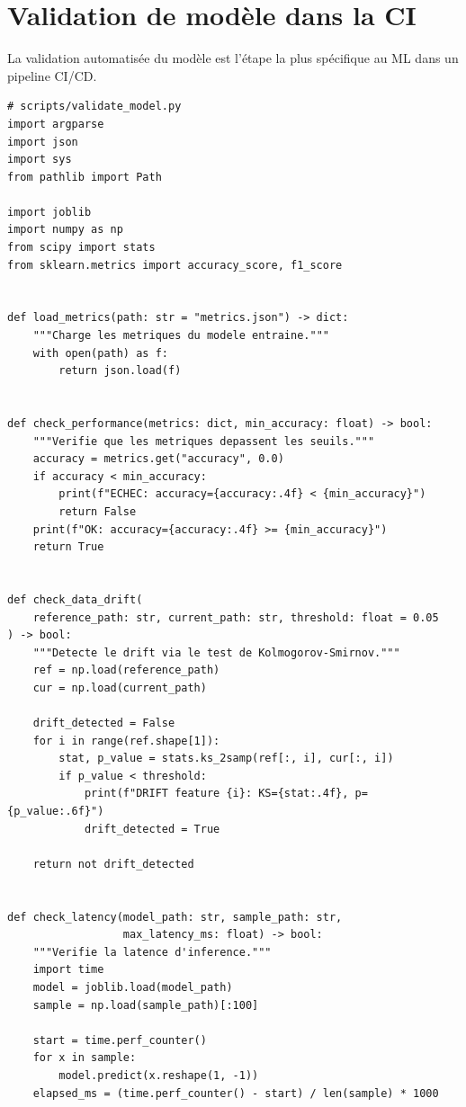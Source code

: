 \section{Validation de mod\`ele dans la CI}
\label{sec:model-validation-ci}

La validation automatis\'ee du mod\`ele est l'\'etape la plus sp\'ecifique au ML dans un pipeline CI/CD.

\begin{codeblock}[title=\textbf{Script de validation de mod\`ele}]
\begin{verbatim}
# scripts/validate_model.py
import argparse
import json
import sys
from pathlib import Path

import joblib
import numpy as np
from scipy import stats
from sklearn.metrics import accuracy_score, f1_score


def load_metrics(path: str = "metrics.json") -> dict:
    """Charge les metriques du modele entraine."""
    with open(path) as f:
        return json.load(f)


def check_performance(metrics: dict, min_accuracy: float) -> bool:
    """Verifie que les metriques depassent les seuils."""
    accuracy = metrics.get("accuracy", 0.0)
    if accuracy < min_accuracy:
        print(f"ECHEC: accuracy={accuracy:.4f} < {min_accuracy}")
        return False
    print(f"OK: accuracy={accuracy:.4f} >= {min_accuracy}")
    return True


def check_data_drift(
    reference_path: str, current_path: str, threshold: float = 0.05
) -> bool:
    """Detecte le drift via le test de Kolmogorov-Smirnov."""
    ref = np.load(reference_path)
    cur = np.load(current_path)

    drift_detected = False
    for i in range(ref.shape[1]):
        stat, p_value = stats.ks_2samp(ref[:, i], cur[:, i])
        if p_value < threshold:
            print(f"DRIFT feature {i}: KS={stat:.4f}, p={p_value:.6f}")
            drift_detected = True

    return not drift_detected


def check_latency(model_path: str, sample_path: str,
                  max_latency_ms: float) -> bool:
    """Verifie la latence d'inference."""
    import time
    model = joblib.load(model_path)
    sample = np.load(sample_path)[:100]

    start = time.perf_counter()
    for x in sample:
        model.predict(x.reshape(1, -1))
    elapsed_ms = (time.perf_counter() - start) / len(sample) * 1000


\end{verbatim}
\end{codeblock}
